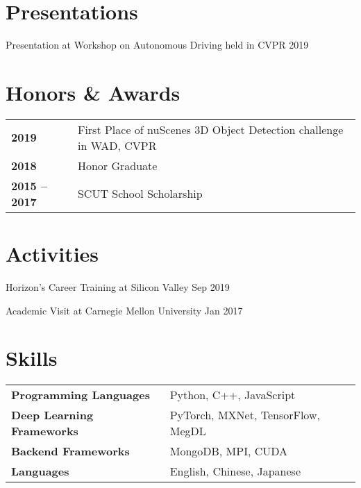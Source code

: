 \documentclass[letterpaper]{article}
\renewenvironment{itemize}{
  \begin{list}{}{
    \setlength{\leftmargin}{1.5em}
  }
}{
  \end{list}
}
\begin{document}

\section*{Presentations}
\begin{itemize}
	\item Presentation at Workshop on Autonomous Driving held in CVPR 2019
\end{itemize}

\section*{Honors \& Awards}
\begin{tabular}{ll}
    \textbf{2019} & First Place of nuScenes 3D Object Detection challenge in WAD, CVPR \\
    \textbf{2018} & Honor Graduate \\
	\textbf{2015 -- 2017} & SCUT School Scholarship \\
\end{tabular}

\section*{Activities}
\begin{itemize}
	\item Horizon's Career Training at Silicon Valley \hfill Sep 2019
	\item Academic Visit at Carnegie Mellon University \hfill Jan 2017
\end{itemize}

\section*{Skills}
\begin{tabular}{ll}
	\textbf{Programming Languages} & Python, C++, JavaScript \\
	\textbf{Deep Learning Frameworks} & PyTorch, MXNet, TensorFlow, MegDL \\
	\textbf{Backend Frameworks} & MongoDB, MPI, CUDA \\
	\textbf{Languages} & English, Chinese, Japanese \\
\end{tabular}
\end{document}
